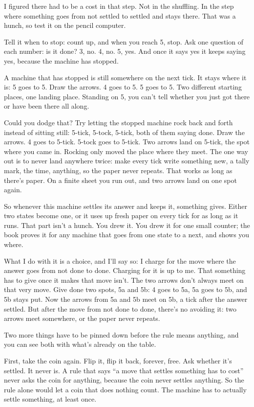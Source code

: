 \documentclass[11pt,twoside]{article}
\theoremstyle{thielethm}
\theoremstyle{thieledef}
\theoremstyle{thieledef}
\theoremstyle{thieledef}
\theoremstyle{thielethm}
\theoremstyle{thieleobs}
\theoremstyle{thielethm}
\begin{document}
I figured there had to be a cost in that step. Not in the shuffling. In the step where something goes from not settled to settled and stays there. That was a hunch, so test it on the pencil computer.

Tell it when to stop: count up, and when you reach 5, stop. Ask one question of each number: is it done? 3, no. 4, no. 5, yes. And once it says yes it keeps saying yes, because the machine has stopped.

A machine that has stopped is still somewhere on the next tick. It stays where it is: 5 goes to 5. Draw the arrows. 4 goes to 5. 5 goes to 5. Two different starting places, one landing place. Standing on 5, you can't tell whether you just got there or have been there all along.

Could you dodge that? Try letting the stopped machine rock back and forth instead of sitting still: 5-tick, 5-tock, 5-tick, both of them saying done. Draw the arrows. 4 goes to 5-tick. 5-tock goes to 5-tick. Two arrows land on 5-tick, the spot where you came in. Rocking only moved the place where they meet. The one way out is to never land anywhere twice: make every tick write something new, a tally mark, the time, anything, so the paper never repeats. That works as long as there's paper. On a finite sheet you run out, and two arrows land on one spot again.

So whenever this machine settles its answer and keeps it, something gives. Either two states become one, or it uses up fresh paper on every tick for as long as it runs. That part isn't a hunch. You drew it. You drew it for one small counter; the book proves it for any machine that goes from one state to a next, and shows you where.

What I do with it is a choice, and I'll say so: I charge for the move where the answer goes from not done to done. Charging for it is up to me. That something has to give once it makes that move isn't. The two arrows don't always meet on that very move. Give done two spots, 5a and 5b: 4 goes to 5a, 5a goes to 5b, and 5b stays put. Now the arrows from 5a and 5b meet on 5b, a tick after the answer settled. But after the move from not done to done, there's no avoiding it: two arrows meet somewhere, or the paper never repeats.

Two more things have to be pinned down before the rule means anything, and you can see both with what's already on the table.

First, take the coin again. Flip it, flip it back, forever, free. Ask whether it's settled. It never is. A rule that says ``a move that settles something has to cost'' never asks the coin for anything, because the coin never settles anything. So the rule alone would let a coin that does nothing count. The machine has to actually settle something, at least once.
\end{document}
